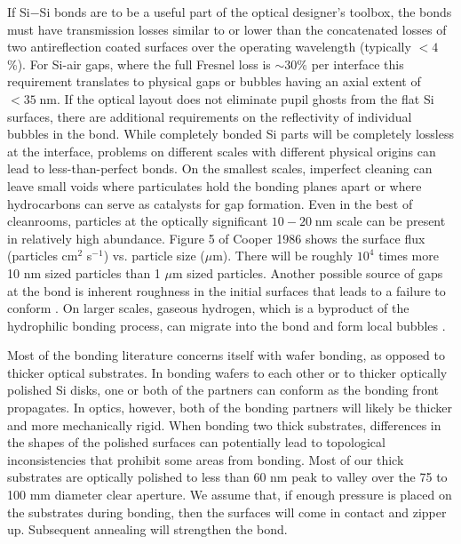If Si$-$Si bonds are to be a useful part of the optical designer's toolbox, the bonds must have transmission losses similar to or lower than the concatenated losses of two antireflection coated surfaces over the operating wavelength (typically $< 4$\%).  For Si-air gaps, where the full Fresnel loss is $\sim30\%$ per interface this requirement translates to physical gaps or bubbles having an axial extent of $ < 35\;$nm.  If the optical layout does not eliminate pupil ghosts from the flat Si surfaces, there are additional requirements on the reflectivity of individual bubbles in the bond. While completely bonded Si parts will be completely lossless at the interface, problems on different scales with different physical origins can lead to less-than-perfect bonds.  On the smallest scales, imperfect cleaning can leave small voids where particulates hold the bonding planes apart \cite{Mitani1990} or where hydrocarbons can serve as catalysts for gap formation.  Even in the best of cleanrooms, particles at the optically significant $10-20\;$nm scale can be present in relatively high abundance. Figure 5 of Cooper 1986 \cite{doi:10.1080/02786828608959094} shows the surface flux (particles cm$^2$ s$^{-1}$) vs. particle size ($\mu$m). There will be roughly $10^4$ times more 10 nm sized particles than 1 $\mu$m sized particles.  Another possible source of gaps at the bond is inherent roughness in the initial surfaces that leads to a failure to conform \cite{2001JOptA...3...85G}.  On larger scales, gaseous hydrogen, which is a byproduct of the hydrophilic bonding process, can migrate into the bond and form local bubbles \cite{Masteika2014}.  

Most of the bonding literature concerns itself with wafer bonding, as opposed to thicker optical substrates.  In bonding wafers to each other or to thicker optically polished Si disks, one or both of the partners can conform as the bonding front propagates.  In optics, however, both of the bonding partners will likely be thicker and more mechanically rigid.  When bonding two thick substrates, differences in the shapes of the polished surfaces can potentially lead to topological inconsistencies that prohibit some areas from bonding.  Most of our thick substrates are optically polished to less than 60 nm peak to valley over the 75 to 100 mm diameter clear aperture.  We assume that, if enough pressure is placed on the substrates during bonding, then the surfaces will come in contact and zipper up.  Subsequent annealing will strengthen the bond.


